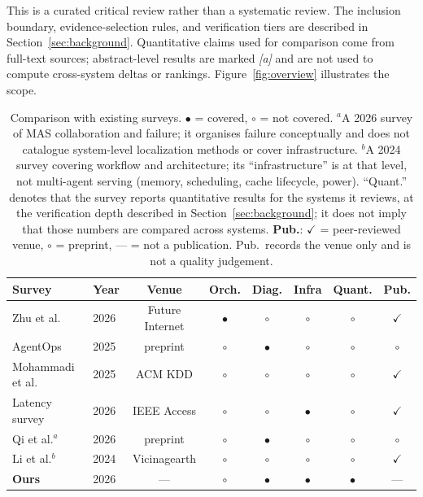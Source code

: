 This is a curated critical review rather than a systematic review. The inclusion boundary, evidence-selection rules, and verification tiers are described in Section~\ref{sec:background}. Quantitative claims used for comparison come from full-text sources; abstract-level results are marked \emph{[a]} and are not used to compute cross-system deltas or rankings. Figure~\ref{fig:overview} illustrates the scope.

\begin{table}[t]
\centering
\caption{Comparison with existing surveys. $\bullet$ = covered, $\circ$ = not covered. $^a$A 2026 survey of MAS collaboration and failure; it organises failure conceptually and does not catalogue system-level localization methods or cover infrastructure. $^b$A 2024 survey covering workflow and architecture; its ``infrastructure'' is at that level, not multi-agent serving (memory, scheduling, cache lifecycle, power). ``Quant.'' denotes that the survey reports quantitative results for the systems it reviews, at the verification depth described in Section~\ref{sec:background}; it does not imply that those numbers are compared across systems. \textbf{Pub.}: $\checkmark$ = peer-reviewed venue, $\circ$ = preprint, --- = not a publication. Pub.\ records the venue only and is not a quality judgement.}
\label{tab:surveys}
\footnotesize
\setlength{\tabcolsep}{6pt}
\begin{tabular}{@{}llcccccc@{}}
\toprule
\textbf{Survey} & \textbf{Year} & \textbf{Venue} & \textbf{Orch.} & \textbf{Diag.} & \textbf{Infra} & \textbf{Quant.} & \textbf{Pub.} \\
\midrule
Zhu et al. & 2026 & Future Internet & $\bullet$ & $\circ$ & $\circ$ & $\circ$ & $\checkmark$ \\
AgentOps & 2025 & preprint & $\circ$ & $\bullet$ & $\circ$ & $\circ$ & $\circ$ \\
Mohammadi et al. & 2025 & ACM KDD & $\circ$ & $\circ$ & $\circ$ & $\circ$ & $\checkmark$ \\
Latency survey & 2026 & IEEE Access & $\circ$ & $\circ$ & $\bullet$ & $\circ$ & $\checkmark$ \\
Qi et al.$^a$ & 2026 & preprint & $\circ$ & $\bullet$ & $\circ$ & $\circ$ & $\circ$ \\
Li et al.$^b$ & 2024 & Vicinagearth & $\circ$ & $\circ$ & $\circ$ & $\circ$ & $\checkmark$ \\
\textbf{Ours} & 2026 & --- & $\circ$ & $\bullet$ & $\bullet$ & $\bullet$ & --- \\
\bottomrule
\end{tabular}
\end{table}

